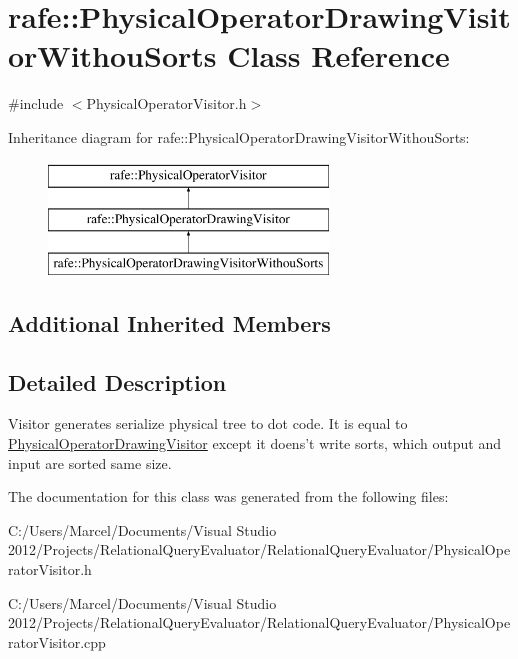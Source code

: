 \hypertarget{classrafe_1_1_physical_operator_drawing_visitor_withou_sorts}{\section{rafe\+:\+:Physical\+Operator\+Drawing\+Visitor\+Withou\+Sorts Class Reference}
\label{classrafe_1_1_physical_operator_drawing_visitor_withou_sorts}
}


{\ttfamily \#include $<$Physical\+Operator\+Visitor.\+h$>$}

Inheritance diagram for rafe\+:\+:Physical\+Operator\+Drawing\+Visitor\+Withou\+Sorts\+:\begin{figure}[H]
\begin{center}
\leavevmode
\includegraphics[height=3.000000cm]{classrafe_1_1_physical_operator_drawing_visitor_withou_sorts}
\end{center}
\end{figure}
\subsection*{Additional Inherited Members}


\subsection{Detailed Description}
Visitor generates serialize physical tree to dot code. It is equal to \hyperlink{classrafe_1_1_physical_operator_drawing_visitor}{Physical\+Operator\+Drawing\+Visitor} except it doens't write sorts, which output and input are sorted same size. 

The documentation for this class was generated from the following files\+:\begin{DoxyCompactItemize}
\item 
C\+:/\+Users/\+Marcel/\+Documents/\+Visual Studio 2012/\+Projects/\+Relational\+Query\+Evaluator/\+Relational\+Query\+Evaluator/Physical\+Operator\+Visitor.\+h\item 
C\+:/\+Users/\+Marcel/\+Documents/\+Visual Studio 2012/\+Projects/\+Relational\+Query\+Evaluator/\+Relational\+Query\+Evaluator/Physical\+Operator\+Visitor.\+cpp\end{DoxyCompactItemize}
